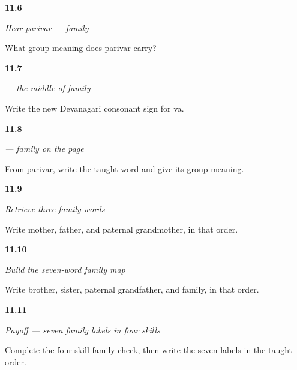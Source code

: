 \noindent\begin{minipage}[t]{\linewidth}
\raggedright
\hypertarget{review-MW-C08-hear-parivaar-meaning}{\textbf{11.6}} \emph{Hear \emph{parivār} — family}\par
\small What group meaning does parivār carry?
\end{minipage}\par\medskip

\noindent\begin{minipage}[t]{\linewidth}
\raggedright
\hypertarget{review-MW-W08-va-write}{\textbf{11.7}} \emph{ — the middle of family}\par
\small Write the new Devanagari consonant sign for va.
\end{minipage}\par\medskip

\noindent\begin{minipage}[t]{\linewidth}
\raggedright
\hypertarget{review-MW-C08-parivaar-dictation}{\textbf{11.8}} \emph{ — family on the page}\par
\small From parivār, write the taught word and give its group meaning.
\end{minipage}\par\medskip

\noindent\begin{minipage}[t]{\linewidth}
\raggedright
\hypertarget{review-MW-R08-family-foundation-three}{\textbf{11.9}} \emph{Retrieve three family words}\par
\small Write mother, father, and paternal grandmother, in that order.
\end{minipage}\par\medskip

\noindent\begin{minipage}[t]{\linewidth}
\raggedright
\hypertarget{review-MW-R08-family-map-four}{\textbf{11.10}} \emph{Build the seven-word family map}\par
\small Write brother, sister, paternal grandfather, and family, in that order.
\end{minipage}\par\medskip

\noindent\begin{minipage}[t]{\linewidth}
\raggedright
\hypertarget{review-MW-C08-family-seven-payoff}{\textbf{11.11}} \emph{Payoff — seven family labels in four skills}\par
\small Complete the four-skill family check, then write the seven labels in the taught order.
\end{minipage}\par\medskip

